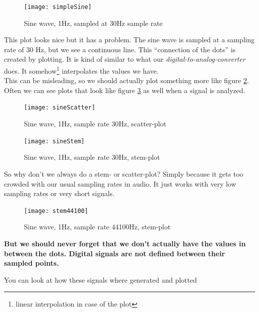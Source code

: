 \begin{figure}[h!]
	\centering
	\texttt{[image: simpleSine]}
	\caption[simple sine plot]
	{Sine wave, 1Hz, sampled at 30Hz sample rate}
	\label{fig:simpeSine}
\end{figure}

This plot looks nice but it has a problem. The sine wave is sampled at a sampling rate of 30 Hz, but we see a continuous line. This ``connection of the dots'' is created by plotting. It is kind of similar to what our \textit{digital-to-analog-converter} does. It somehow\footnote{linear interpolation in case of the plot} interpolates the values we have. \\
This can be misleading, so we should actually plot something more like figure \ref{fig:scatter}. Often we can see plots that look like figure \ref{fig:stem} as well when a signal is analyzed.

\begin{figure}[H]
	\centering
	\texttt{[image: sineScatter]}
	\caption[Sine scatter-plot]
	{Sine wave, 1Hz, sample rate 30Hz, scatter-plot}
	\label{fig:scatter}
\end{figure}



\begin{figure}[H]
	\centering
	\texttt{[image: sineStem]}
	\caption[sine stem plot]
	{Sine wave, 1Hz, sample rate 30Hz, stem-plot}
	\label{fig:stem}
\end{figure}


So why don't we always do a stem- or scatter-plot? Simply because it gets too crowded with our usual sampling rates in audio. It just works with very low sampling rates or very short signals.\\
\begin{figure}[H]
	\centering
	\texttt{[image: stem44100]}
	\caption[sine stem plot, crowded]
	{Sine wave, 1Hz, sample rate 44100Hz, stem-plot}
	\label{fig:label}
\end{figure}
\textbf{But we should never forget that we don't actually have the values in between the dots. Digital signals are not defined between their sampled points.}

You can look at how these signals where generated and plotted 

